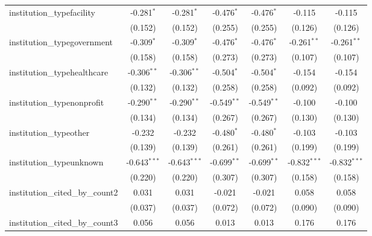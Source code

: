 \begin{tabular}{lcccccc}
   institution\_typefacility             & -0.281$^{*}$   & -0.281$^{*}$   & -0.476$^{*}$   & -0.476$^{*}$   & -0.115         & -0.115\\   
                                         & (0.152)        & (0.152)        & (0.255)        & (0.255)        & (0.126)        & (0.126)\\   
   institution\_typegovernment           & -0.309$^{*}$   & -0.309$^{*}$   & -0.476$^{*}$   & -0.476$^{*}$   & -0.261$^{**}$  & -0.261$^{**}$\\   
                                         & (0.158)        & (0.158)        & (0.273)        & (0.273)        & (0.107)        & (0.107)\\   
   institution\_typehealthcare           & -0.306$^{**}$  & -0.306$^{**}$  & -0.504$^{*}$   & -0.504$^{*}$   & -0.154         & -0.154\\   
                                         & (0.132)        & (0.132)        & (0.258)        & (0.258)        & (0.092)        & (0.092)\\   
   institution\_typenonprofit            & -0.290$^{**}$  & -0.290$^{**}$  & -0.549$^{**}$  & -0.549$^{**}$  & -0.100         & -0.100\\   
                                         & (0.134)        & (0.134)        & (0.267)        & (0.267)        & (0.130)        & (0.130)\\   
   institution\_typeother                & -0.232         & -0.232         & -0.480$^{*}$   & -0.480$^{*}$   & -0.103         & -0.103\\   
                                         & (0.139)        & (0.139)        & (0.261)        & (0.261)        & (0.199)        & (0.199)\\   
   institution\_typeunknown              & -0.643$^{***}$ & -0.643$^{***}$ & -0.699$^{**}$  & -0.699$^{**}$  & -0.832$^{***}$ & -0.832$^{***}$\\   
                                         & (0.220)        & (0.220)        & (0.307)        & (0.307)        & (0.158)        & (0.158)\\   
   institution\_cited\_by\_count2        & 0.031          & 0.031          & -0.021         & -0.021         & 0.058          & 0.058\\   
                                         & (0.037)        & (0.037)        & (0.072)        & (0.072)        & (0.090)        & (0.090)\\   
   institution\_cited\_by\_count3        & 0.056          & 0.056          & 0.013          & 0.013          & 0.176          & 0.176\\   

\end{tabular}

